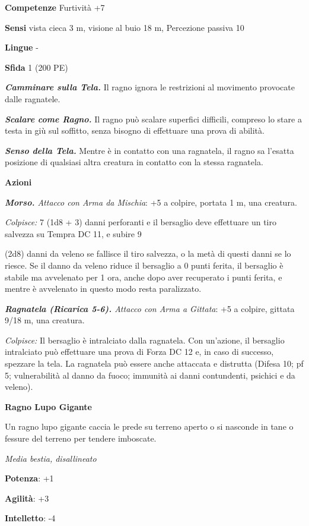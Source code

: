 \begin{multicols}{2}
\textbf{Competenze} Furtività +7

\textbf{Sensi} vista cieca 3 m, visione al buio 18 m, Percezione passiva
10

\textbf{Lingue} -

\textbf{Sfida} 1 (200 PE)\smallskip

\emph{\textbf{Camminare sulla Tela.}} Il ragno ignora le restrizioni al
movimento provocate dalle ragnatele.

\emph{\textbf{Scalare come Ragno.}} Il ragno può scalare superfici
difficili, compreso lo stare a testa in giù sul soffitto, senza bisogno
di effettuare una prova di abilità.

\emph{\textbf{Senso della Tela.}} Mentre è in contatto con una
ragnatela, il ragno sa l'esatta posizione di qualsiasi altra creatura in
contatto con la stessa ragnatela.

\smallskip\textbf{Azioni}

\emph{\textbf{Morso.} Attacco con Arma da Mischia}: +5 a colpire,
portata 1 m, una creatura.

\emph{Colpisce:} 7 (1d8 + 3) danni perforanti e il bersaglio deve
effettuare un tiro salvezza su Tempra DC 11, e subire 9

(2d8) danni da veleno se fallisce il tiro salvezza, o la metà di questi
danni se lo riesce. Se il danno da veleno riduce il bersaglio a 0 punti
ferita, il bersaglio è stabile ma avvelenato per 1 ora, anche dopo aver
recuperato i punti ferita, e mentre è avvelenato in questo modo resta
paralizzato.

\emph{\textbf{Ragnatela (Ricarica 5-6).} Attacco con Arma a Gittata}: +5
a colpire, gittata 9/18 m, una creatura.

\emph{Colpisce:} Il bersaglio è intralciato dalla ragnatela. Con
un'azione, il bersaglio intralciato può effettuare una prova di Forza DC
12 e, in caso di successo, spezzare la tela. La ragnatela può essere
anche attaccata e distrutta (Difesa 10; pf 5; vulnerabilità al danno da
fuoco; immunità ai danni contundenti, psichici e da veleno).

\textbf{Ragno Lupo Gigante}

Un ragno lupo gigante caccia le prede su terreno aperto o si nasconde in
tane o fessure del terreno per tendere imboscate.

\emph{Media bestia, disallineato}

\textbf{Potenza}: +1

\textbf{Agilità}: +3

\textbf{Intelletto}: -4


\end{multicols}
